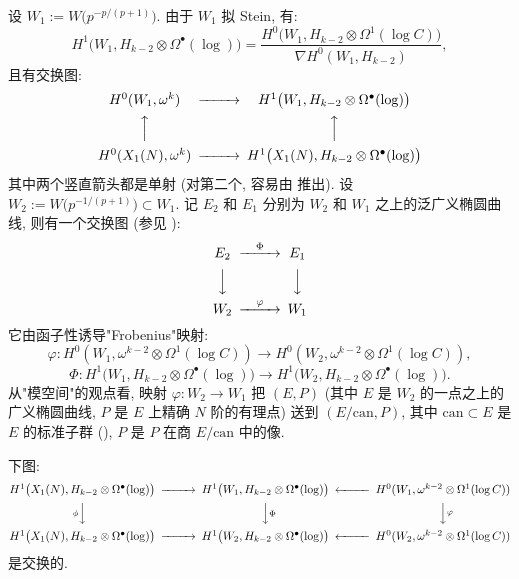 设 $W_1 := W\bigl(p^{-p/(p+1)}\bigr)$.
由于 $W_1$ 拟 Stein, 有:
\[
H^{1}\bigl(W_1,H_{k-2} \otimes \Omega^{\bullet}(\log)\bigr) = \frac{H^{0}\bigl(W_1,H_{k-2} \otimes \Omega^{1}(\log C)\bigr)}{\nabla H^{0}(W_1,H_{k-2})},
\]
且有交换图:
\begin{equation}
\label{eq:18}
\begin{CD}
H^{0}(W_1,\omega^{k}) @>>> H^{1}\bigl(W_1,H_{k-2} \otimes \Omega^{\bullet}(\log)\bigr)\\
@AAA @AAA\\
H^{0}(X_1(N),\omega^{k}) @>{ }>> H^{1}\bigl(X_1(N),H_{k-2} \otimes \Omega^{\bullet}(\log)\bigr)
\end{CD}
\end{equation}
其中两个竖直箭头都是单射 (对第二个, 容易由 \cite[Th.~2.1 和 Th.~2.4]{ref:2} 推出).
设 $W_2 := W\bigl(p^{-1/(p+1)}\bigr) \subset W_1$.
记 $E_2$ 和 $E_1$ 分别为 $W_2$ 和 $W_1$ 之上的泛广义椭圆曲线, 则有一个交换图 (参见 \cite[\S2]{ref:13}):
\begin{equation}
\label{eq:19}
\begin{CD}
E_2 @>{\Phi}>> E_1\\
@VVV @VVV\\
W_2 @>{\varphi}>> W_1
\end{CD}
\end{equation}
它由函子性诱导"Frobenius"映射:
\[
\varphi : H^{0}(W_1,\omega^{k-2} \otimes \Omega^{1}(\log C)) \to H^{0}(W_2,\omega^{k-2} \otimes \Omega^{1}(\log C)),
\]
\[
\Phi : H^{1}\bigl(W_1,H_{k-2} \otimes \Omega^{\bullet}(\log)\bigr) \to H^{1}\bigl(W_2,H_{k-2} \otimes \Omega^{\bullet}(\log)\bigr).
\]
从"模空间"的观点看, 映射 $\varphi : W_2 \to W_1$ 把 $(E,P)$ (其中 $E$ 是 $W_2$ 的一点之上的广义椭圆曲线, $P$ 是 $E$ 上精确 $N$ 阶的有理点) 送到 $(E/\mathrm{can},P)$, 其中 $\mathrm{can} \subset E$ 是 $E$ 的标准子群 (\cite[\S3]{ref:35}), $P$ 是 $P$ 在商 $E/\mathrm{can}$ 中的像.

\begin{lemma}\label{lem:4.3.1}
下图:
\[
\begin{CD}
H^{1}\bigl(X_1(N),H_{k-2}\otimes\Omega^{\bullet}(\log)\bigr) @>{ }>> H^{1}\bigl(W_1,H_{k-2}\otimes\Omega^{\bullet}(\log)\bigr) @<<< H^{0}(W_1,\omega^{k-2}\otimes\Omega^{1}(\log C))\\
@V{\phi}VV @VV{\Phi}V @VV{\varphi}V\\
H^{1}\bigl(X_1(N),H_{k-2}\otimes\Omega^{\bullet}(\log)\bigr) @>{ }>> H^{1}\bigl(W_2,H_{k-2}\otimes\Omega^{\bullet}(\log)\bigr) @<<< H^{0}(W_2,\omega^{k-2}\otimes\Omega^{1}(\log C))
\end{CD}
\]
是交换的.
\end{lemma}

